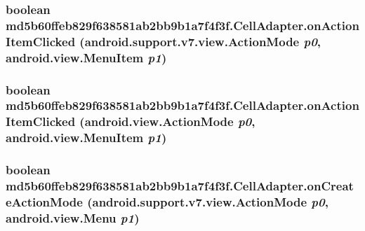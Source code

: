 \hypertarget{classmd5b60ffeb829f638581ab2bb9b1a7f4f3f_1_1_cell_adapter_49e5cfeb93c21213d2f7962e65898a5e}{
\subsubsection[{onActionItemClicked}]{\setlength{\rightskip}{0pt plus 5cm}boolean md5b60ffeb829f638581ab2bb9b1a7f4f3f.CellAdapter.onActionItemClicked (android.support.v7.view.ActionMode {\em p0}, \/  android.view.MenuItem {\em p1})}}
\label{classmd5b60ffeb829f638581ab2bb9b1a7f4f3f_1_1_cell_adapter_49e5cfeb93c21213d2f7962e65898a5e}


\hypertarget{classmd5b60ffeb829f638581ab2bb9b1a7f4f3f_1_1_cell_adapter_1febf1cc030736547768ae04d9ae8a8b}{
\subsubsection[{onActionItemClicked}]{\setlength{\rightskip}{0pt plus 5cm}boolean md5b60ffeb829f638581ab2bb9b1a7f4f3f.CellAdapter.onActionItemClicked (android.view.ActionMode {\em p0}, \/  android.view.MenuItem {\em p1})}}
\label{classmd5b60ffeb829f638581ab2bb9b1a7f4f3f_1_1_cell_adapter_1febf1cc030736547768ae04d9ae8a8b}


\hypertarget{classmd5b60ffeb829f638581ab2bb9b1a7f4f3f_1_1_cell_adapter_f5577bc64f0be210f22a89792a8be639}{
\subsubsection[{onCreateActionMode}]{\setlength{\rightskip}{0pt plus 5cm}boolean md5b60ffeb829f638581ab2bb9b1a7f4f3f.CellAdapter.onCreateActionMode (android.support.v7.view.ActionMode {\em p0}, \/  android.view.Menu {\em p1})}}
\label{classmd5b60ffeb829f638581ab2bb9b1a7f4f3f_1_1_cell_adapter_f5577bc64f0be210f22a89792a8be639}


